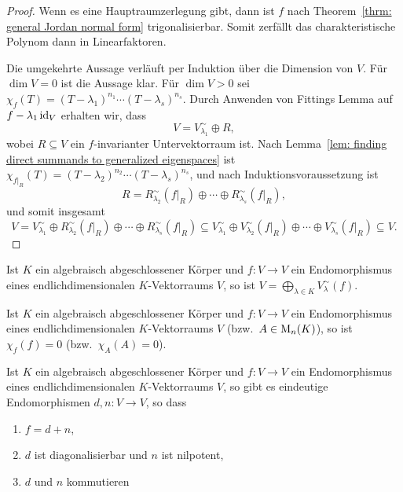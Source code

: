 \begin{proof}
  Wenn es eine Hauptraumzerlegung gibt, dann ist $f$ nach Theorem~\ref{thrm: general Jordan normal form} trigonalisierbar.
  Somit zerfällt das charakteristische Polynom dann in Linearfaktoren.
  
  Die umgekehrte Aussage verläuft per Induktion über die Dimension von $V$.
  Für $\dim V = 0$ ist die Aussage klar.
  Für $\dim V > 0$ sei $\chi_f(T) = (T - \lambda_1)^{n_1} \dotsm (T - \lambda_s)^{n_s}$.
  Durch Anwenden von Fittings Lemma auf $f - \lambda_1 \operatorname{id}_V$ erhalten wir, dass
  \[
    V = V^\sim_{\lambda_1} \oplus R,
  \]
  wobei $R \subseteq V$ ein $f$-invarianter Untervektorraum ist.
  Nach Lemma~\ref{lem: finding direct summands to generalized eigenspaces} ist $\chi_{f|_R}(T) = (T - \lambda_2)^{n_2} \dotsm (T - \lambda_s)^{n_s}$, und nach Induktionsvoraussetzung ist
  \[
    R = R^\sim_{\lambda_2}(f|_R) \oplus \dotsb \oplus R^\sim_{\lambda_s}(f|_R),
  \]
  und somit insgesamt
  \[
              V
    =         V^\sim_{\lambda_1} \oplus R^\sim_{\lambda_2}(f|_R) \oplus \dotsb \oplus R^\sim_{\lambda_s}(f|_R)
    \subseteq V^\sim_{\lambda_1} \oplus V^\sim_{\lambda_2}(f|_R) \oplus \dotsb \oplus V^\sim_{\lambda_s}(f|_R)
    \subseteq V.
  \]
\end{proof}


\begin{corollary}
  Ist $K$ ein algebraisch abgeschlossener Körper und $f \colon V \to V$ ein Endomorphismus eines endlichdimensionalen $K$-Vektorraums $V$, so ist $V = \bigoplus_{\lambda \in K} V^\sim_\lambda(f)$.
\end{corollary}


\begin{corollary}
  Ist $K$ ein algebraisch abgeschlossener Körper und $f \colon V \to V$ ein Endomorphismus eines endlichdimensionalen $K$-Vektorraums $V$ (bzw.\ $A \in \mathrm{M}_n(K)$), so ist $\chi_f(f) = 0$ (bzw.\ $\chi_A(A) = 0$).
\end{corollary}


\begin{corollary}
  Ist $K$ ein algebraisch abgeschlossener Körper und $f \colon V \to V$ ein Endomorphismus eines endlichdimensionalen $K$-Vektorraums $V$, so gibt es eindeutige Endomorphismen $d, n \colon V \to V$, so dass
  \begin{enumerate}[leftmargin=*, label=\alph*)]
    \item
      $f = d + n$,
    \item
      $d$ ist diagonalisierbar und $n$ ist nilpotent,
    \item
      $d$ und $n$ kommutieren
  \end{enumerate}
\end{corollary}


